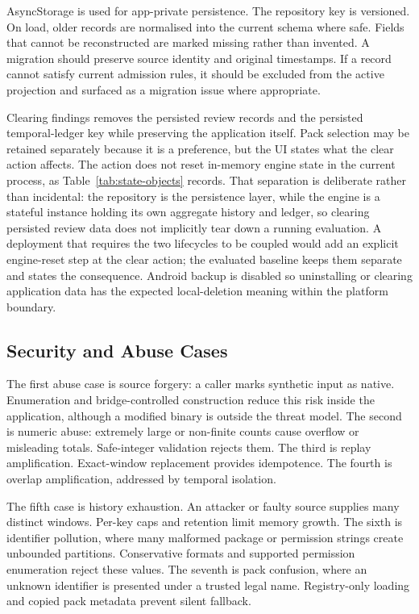 AsyncStorage is used for app-private persistence. The repository key is versioned. On load, older records are normalised into the current schema where safe. Fields that cannot be reconstructed are marked missing rather than invented. A migration should preserve source identity and original timestamps. If a record cannot satisfy current admission rules, it should be excluded from the active projection and surfaced as a migration issue where appropriate.

Clearing findings removes the persisted review records and the persisted temporal-ledger key while preserving the application itself. Pack selection may be retained separately because it is a preference, but the UI states what the clear action affects. The action does not reset in-memory engine state in the current process, as Table~\ref{tab:state-objects} records. That separation is deliberate rather than incidental: the repository is the persistence layer, while the engine is a stateful instance holding its own aggregate history and ledger, so clearing persisted review data does not implicitly tear down a running evaluation. A deployment that requires the two lifecycles to be coupled would add an explicit engine-reset step at the clear action; the evaluated baseline keeps them separate and states the consequence. Android backup is disabled so uninstalling or clearing application data has the expected local-deletion meaning within the platform boundary.

\subsection{Security and Abuse Cases}

The first abuse case is source forgery: a caller marks synthetic input as native. Enumeration and bridge-controlled construction reduce this risk inside the application, although a modified binary is outside the threat model. The second is numeric abuse: extremely large or non-finite counts cause overflow or misleading totals. Safe-integer validation rejects them. The third is replay amplification. Exact-window replacement provides idempotence. The fourth is overlap amplification, addressed by temporal isolation.

The fifth case is history exhaustion. An attacker or faulty source supplies many distinct windows. Per-key caps and retention limit memory growth. The sixth is identifier pollution, where many malformed package or permission strings create unbounded partitions. Conservative formats and supported permission enumeration reject these values. The seventh is pack confusion, where an unknown identifier is presented under a trusted legal name. Registry-only loading and copied pack metadata prevent silent fallback.

